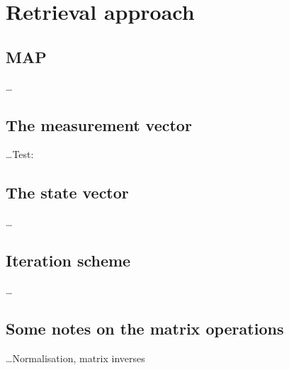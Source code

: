 \chapter{Retrieval approach}
\label{chapter:retrieval}

\section{MAP}
\label{sec:map}
%
\dots


\section{The measurement vector}
\label{sec:y}
%
\dots Test: \MsrVct


\section{The state vector}
\label{sec:x}
%
\dots


\section{Iteration scheme}
\label{sec:ml}
%
\dots


\section{Some notes on the matrix operations}
\label{sec:matrixops}
%
\dots Normalisation, matrix inverses





